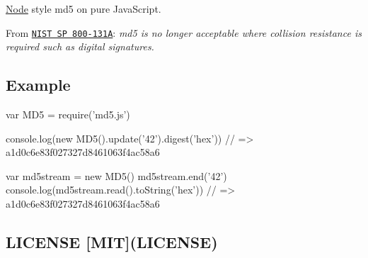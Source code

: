 \href{https://www.npmjs.org/package/md5.js}{\tt } \href{https://travis-ci.org/crypto-browserify/md5.js}{\tt } \href{https://david-dm.org/crypto-browserify/md5.js#info=dependencies}{\tt }

\href{https://github.com/feross/standard}{\tt }

\mbox{\hyperlink{classNode}{Node}} style {\ttfamily md5} on pure Java\+Script.

From \href{http://nvlpubs.nist.gov/nistpubs/SpecialPublications/NIST.SP.800-131Ar1.pdf}{\tt N\+I\+ST SP 800-\/131A}\+: {\itshape md5 is no longer acceptable where collision resistance is required such as digital signatures.}

\subsection*{Example}


\begin{DoxyCode}
var MD5 = require('md5.js')

console.log(new MD5().update('42').digest('hex'))
// => a1d0c6e83f027327d8461063f4ac58a6

var md5stream = new MD5()
md5stream.end('42')
console.log(md5stream.read().toString('hex'))
// => a1d0c6e83f027327d8461063f4ac58a6
\end{DoxyCode}


\subsection*{L\+I\+C\+E\+N\+SE \mbox{[}M\+IT\mbox{]}(L\+I\+C\+E\+N\+SE)}